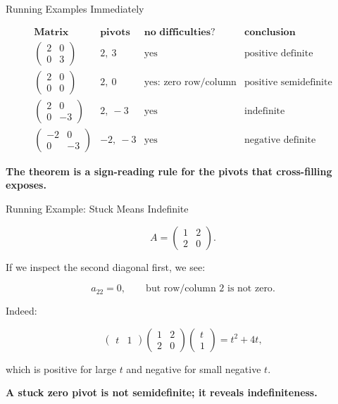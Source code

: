 \documentclass[10pt]{beamer}
\theoremstyle{definition}
\newcommand{\x}[1]{\alert{\textbf{#1}}}
\begin{document}
\begin{frame}[shrink=8]{Running Examples Immediately}

\[
\begin{array}{c|c|c|c}
\textbf{Matrix} & \textbf{pivots} & \textbf{no difficulties?} & \textbf{conclusion}\\
\hline
\begin{pmatrix}2&0\\0&3\end{pmatrix}
& 2,\ 3
& \text{yes}
& \text{positive definite}\\[0.9em]
\begin{pmatrix}2&0\\0&0\end{pmatrix}
& 2,\ 0
& \text{yes: zero row/column}
& \text{positive semidefinite}\\[0.9em]
\begin{pmatrix}2&0\\0&-3\end{pmatrix}
& 2,\ -3
& \text{yes}
& \text{indefinite}\\[0.9em]
\begin{pmatrix}-2&0\\0&-3\end{pmatrix}
& -2,\ -3
& \text{yes}
& \text{negative definite}
\end{array}
\]

\vfill

\begin{center}
\x{The theorem is a sign-reading rule for the pivots that cross-filling exposes.}
\end{center}

\end{frame}


\begin{frame}[shrink=6]{Running Example: Stuck Means Indefinite}

\[
A=
\begin{pmatrix}
1&2\\
2&0
\end{pmatrix}.
\]

\vfill

If we inspect the second diagonal first, we see:

$$
a_{22}=0,\qquad \text{but row/column }2\text{ is not zero}.
$$

\vfill

Indeed:

$$
\begin{pmatrix}t&1\end{pmatrix}
\begin{pmatrix}1&2\\2&0\end{pmatrix}
\begin{pmatrix}t\\1\end{pmatrix}
=t^2+4t,
$$

which is positive for large $t$ and negative for small negative $t$.

\begin{center}
\x{A stuck zero pivot is not semidefinite; it reveals indefiniteness.}
\end{center}

\end{frame}
\end{document}
